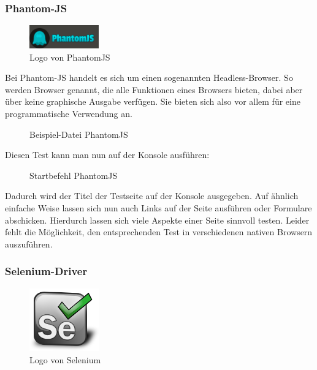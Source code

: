 \subsubsection{Phantom-JS}

\begin{figure}[H]
	\begin{center}
		\includegraphics[width=3cm]{bilder/phantomjs}
		\caption{Logo von PhantomJS}
		\label{image:phantomjs}
	\end{center}
\end{figure}

Bei Phantom-JS handelt es sich um einen sogenannten Headless-Browser. So werden Browser genannt, die alle Funktionen eines Browsers bieten, dabei aber über keine graphische Ausgabe verfügen. Sie bieten sich also vor allem für eine programmatische Verwendung an.

\begin{figure}[H]
	\begin{center}
		\caption{Beispiel-Datei PhantomJS}
		\label{code:phantomjs}
	\end{center}
\end{figure}

Diesen Test kann man nun auf der Konsole ausführen:

\begin{figure}[H]
	\begin{center}
		\caption{Startbefehl PhantomJS}
		\label{bash:phantomjs}
	\end{center}
\end{figure}

Dadurch wird der Titel der Testseite auf der Konsole ausgegeben. Auf ähnlich einfache Weise lassen sich nun auch Links auf der Seite ausführen oder Formulare abschicken. Hierdurch lassen sich viele Aspekte einer Seite sinnvoll testen. Leider fehlt die Möglichkeit, den entsprechenden Test in verschiedenen nativen Browsern auszuführen.

\subsubsection{Selenium-Driver}

\begin{figure}[H]
	\begin{center}
		\includegraphics[width=3cm]{bilder/selenium}
		\caption{Logo von Selenium}
		\label{image:selenium}
	\end{center}
\end{figure}

